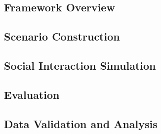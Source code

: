 \subsection{Framework Overview}\label{sec:framework_overview}


\subsection{Scenario Construction}\label{sec:scenario_construction}


\subsection{Social Interaction Simulation}


\subsection{Evaluation}


\subsection{Data Validation and Analysis}\label{sec:data_analysis}

